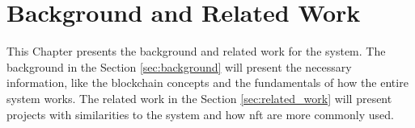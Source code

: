 \chapter{Background and Related Work}
\label{ch:background_and_related_work}

This Chapter presents the background and related work for the system. The
background in the Section \ref{sec:background} will present the necessary
information, like the blockchain concepts and the fundamentals of how the
entire system works. The related work in the Section \ref{sec:related_work}
will present projects with similarities to the system and how \gls{nft} are
more commonly used.




